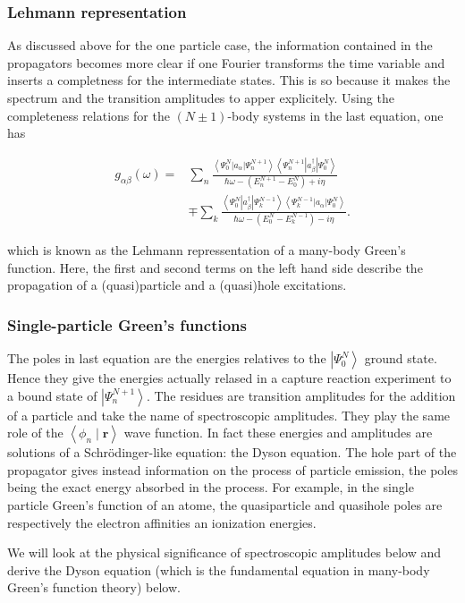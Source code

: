 \documentclass[compress]{beamer}
\begin{document}
\frame
{
\frametitle{Lehmann representation}
\begin{small}
{\scriptsize

As discussed above for the one particle case, the information
contained in the propagators becomes more clear if one Fourier
transforms the time variable and inserts a completness for the
intermediate states. This is so because it makes the spectrum and the
transition amplitudes to apper explicitely. Using the completeness
relations for the $(N \pm 1)$-body systems in the last equation, one has

$$
\begin{aligned}
g_{\alpha \beta}(\omega)= & \sum_{n} \frac{\left\langle\Psi_{0}^{N}\left|a_{\alpha}\right| \Psi_{n}^{N+1}\right\rangle\left\langle\Psi_{n}^{N+1}\left|a_{\beta}^{\dagger}\right| \Psi_{0}^{N}\right\rangle}{\hbar \omega-\left(E_{n}^{N+1}-E_{0}^{N}\right)+i \eta} \\
& \mp \sum_{k} \frac{\left\langle\Psi_{0}^{N}\left|a_{\beta}^{\dagger}\right| \Psi_{k}^{N-1}\right\rangle\left\langle\Psi_{k}^{N-1}\left|a_{\alpha}\right| \Psi_{0}^{N}\right\rangle}{\hbar \omega-\left(E_{0}^{N}-E_{k}^{N-1}\right)-i \eta} .
\end{aligned}
$$

which is known as the Lehmann repressentation of a many-body Green's
function. Here, the first and second terms on the left hand
side describe the propagation of a (quasi)particle and a (quasi)hole
excitations.

}
\end{small}
}
\frame
{
\frametitle{Single-particle Green's functions}
\begin{small}
{\scriptsize
The poles in last equation are the energies relatives to the
$\left|\Psi_{0}^{N}\right\rangle$ ground state. Hence they give the
energies actually relased in a capture reaction experiment to a bound
state of $\left|\Psi_{n}^{N+1}\right\rangle$. The residues are
transition amplitudes for the addition of a particle and take the name
of spectroscopic amplitudes. They play the same role of the
$\left\langle\phi_{n} \mid \mathbf{r}\right\rangle$ wave function.
In fact these energies and amplitudes are solutions of a
Schr\"odinger-like equation: the Dyson equation. The hole part of the
propagator gives instead information on the process of particle
emission, the poles being the exact energy absorbed in the
process. For example, in the single particle Green's function of an atome,
the quasiparticle and quasihole poles are respectively the
electron affinities an ionization energies.

We will look at the physical significance of spectroscopic amplitudes
below and derive the Dyson equation (which is the
fundamental equation in many-body Green's function theory) below.

}
\end{small}
}
\end{document}
